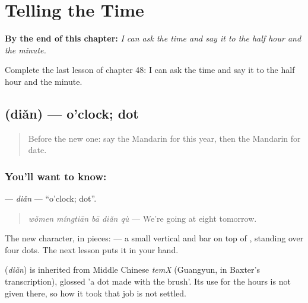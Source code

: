 
\chapter{Telling the Time}
\label{ch:zh-telling-the-time}

\begin{chapteropening}
\textbf{By the end of this chapter:} \emph{I can ask the time and say it to the half hour and the minute.}

Complete the last lesson of chapter 48: I can ask the time and say it to the half hour and the minute.
\end{chapteropening}

\section[\texorpdfstring{\zh{点} (diǎn)}{点 (diǎn)}]{ (diǎn) — o'clock; dot}

\label{lesson:ZH-C48-dian}



\begin{quote}
Before the new one: say the Mandarin for this year, then the Mandarin for date.
\end{quote}

\subsection*{You'll want to know: }
\textbf{} — \emph{diǎn} — \textquotedblleft{}o'clock; dot\textquotedblright{}.

\begin{quote}
\textbf{} \emph{wǒmen míngtiān bā diǎn qù} — We're going at eight tomorrow.
\end{quote}

The new character, in pieces:  — a small vertical and bar on top of , standing over four dots. The next lesson puts it in your hand.

\begin{cousinweb}
\textbf{} (\emph{diǎn}) is inherited from Middle Chinese \emph{temX} (Guangyun, in Baxter's transcription), glossed 'a dot made with the brush'. Its use for the hours is not given there, so how it took that job is not settled.
\end{cousinweb}

